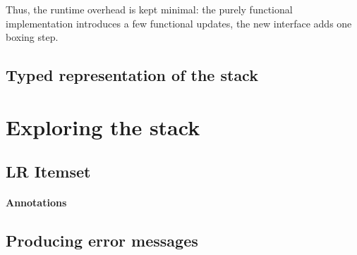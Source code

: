 \documentclass[twoside,a4paper]{article}
\begin{document}
Thus, the runtime overhead is kept minimal: the purely functional
implementation introduces a few functional updates, the new interface adds one
boxing step.



\subsection{Typed representation of the stack}




\section{Exploring the stack}

\subsection{LR Itemset}

\paragraph{Annotations}

\subsection{Producing error messages}
\end{document}
